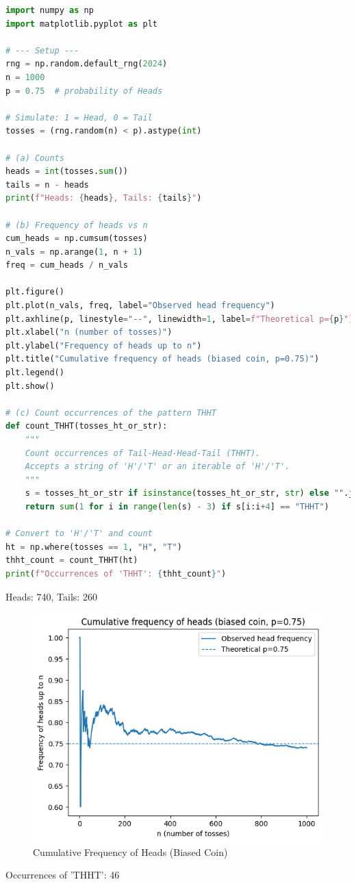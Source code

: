 \documentclass[dvipsnames,11pt]{article}
\begin{document}
\begin{enumerate}
            \begin{solution}
    
\begin{lstlisting}[language=python]
import numpy as np
import matplotlib.pyplot as plt

# --- Setup ---
rng = np.random.default_rng(2024)
n = 1000
p = 0.75  # probability of Heads

# Simulate: 1 = Head, 0 = Tail
tosses = (rng.random(n) < p).astype(int)

# (a) Counts
heads = int(tosses.sum())
tails = n - heads
print(f"Heads: {heads}, Tails: {tails}")

# (b) Frequency of heads vs n
cum_heads = np.cumsum(tosses)
n_vals = np.arange(1, n + 1)
freq = cum_heads / n_vals

plt.figure()
plt.plot(n_vals, freq, label="Observed head frequency")
plt.axhline(p, linestyle="--", linewidth=1, label=f"Theoretical p={p}")
plt.xlabel("n (number of tosses)")
plt.ylabel("Frequency of heads up to n")
plt.title("Cumulative frequency of heads (biased coin, p=0.75)")
plt.legend()
plt.show()

# (c) Count occurrences of the pattern THHT
def count_THHT(tosses_ht_or_str):
    """
    Count occurrences of Tail-Head-Head-Tail (THHT).
    Accepts a string of 'H'/'T' or an iterable of 'H'/'T'.
    """
    s = tosses_ht_or_str if isinstance(tosses_ht_or_str, str) else "".join(tosses_ht_or_str)
    return sum(1 for i in range(len(s) - 3) if s[i:i+4] == "THHT")

# Convert to 'H'/'T' and count
ht = np.where(tosses == 1, "H", "T")
thht_count = count_THHT(ht)
print(f"Occurrences of 'THHT': {thht_count}")
\end{lstlisting}

                Heads: 740, Tails: 260

                    \begin{figure}[ht]
                        \centering
                        \includegraphics[width=0.5\linewidth]{Q2d.png}
                        \caption{Cumulative Frequency of Heads (Biased Coin)}
                        \label{fig:placeholder}
                    \end{figure}

                Occurrences of 'THHT': 46
                
            \end{solution}
            
    \end{enumerate}
\end{document}
